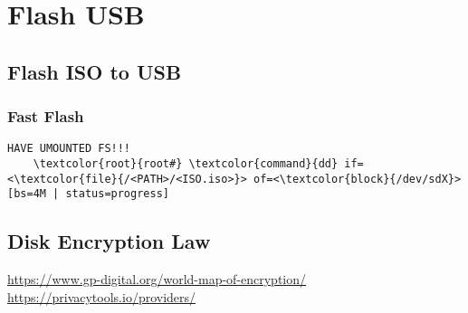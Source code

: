 \documentclass[10pt, a4paper, onecolumn, openany]{book} %
\begin{document}
\chapter{Flash USB}%
\section{Flash ISO to USB}
\subsection{Fast Flash}
\begin{Verbatim}[commandchars=\\\{\}]
HAVE UMOUNTED FS!!!
    \textcolor{root}{root#} \textcolor{command}{dd} if=<\textcolor{file}{/<PATH>/<ISO.iso>}> of=<\textcolor{block}{/dev/sdX}> [bs=4M | status=progress]
\end{Verbatim}

\section{Disk Encryption Law}
\underline{\url{https://www.gp-digital.org/world-map-of-encryption/}}
\underline{\url{https://privacytools.io/providers/}}

%
%
\end{document}
